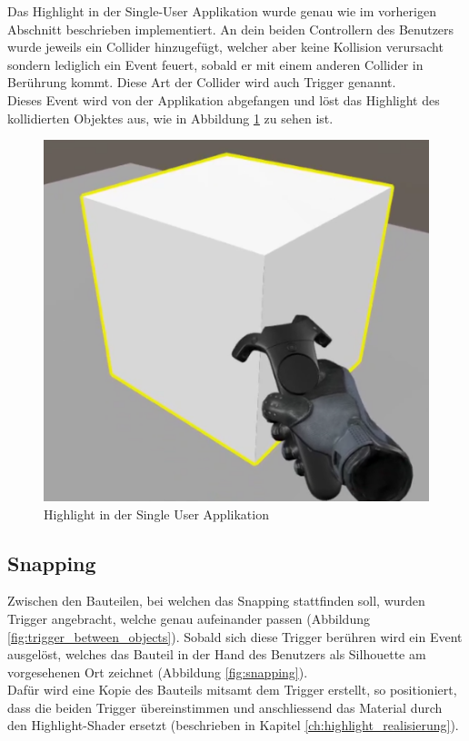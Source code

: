 \noindent Das Highlight in der Single-User Applikation wurde genau wie im vorherigen Abschnitt beschrieben implementiert. An dein beiden Controllern des Benutzers wurde jeweils ein Collider hinzugefügt, welcher aber keine Kollision verursacht sondern lediglich ein Event feuert, sobald er mit einem anderen Collider in Berührung kommt. Diese Art der Collider wird auch Trigger genannt. \\
Dieses Event wird von der Applikation abgefangen und löst das Highlight des kollidierten Objektes aus, wie in Abbildung \ref{fig:highlight_single_user_application} zu sehen ist.

\begin{figure}[h!]
	\centering
	\includegraphics[keepaspectratio,width=0.4\linewidth]{img/Single_User_Highlight.PNG}
	\caption{Highlight in der Single User Applikation}
	\label{fig:highlight_single_user_application}
\end{figure}

\subsection{Snapping}
Zwischen den Bauteilen, bei welchen das Snapping stattfinden soll, wurden Trigger angebracht, welche genau aufeinander passen (Abbildung \ref{fig:trigger_between_objects}). Sobald sich diese Trigger berühren wird ein Event ausgelöst, welches das Bauteil in der Hand des Benutzers als Silhouette am vorgesehenen Ort zeichnet (Abbildung \ref{fig:snapping}). \\
Dafür wird eine Kopie des Bauteils mitsamt dem Trigger erstellt, so positioniert, dass die beiden Trigger übereinstimmen und anschliessend das Material durch den Highlight-Shader ersetzt (beschrieben in Kapitel \ref{ch:highlight_realisierung}).

